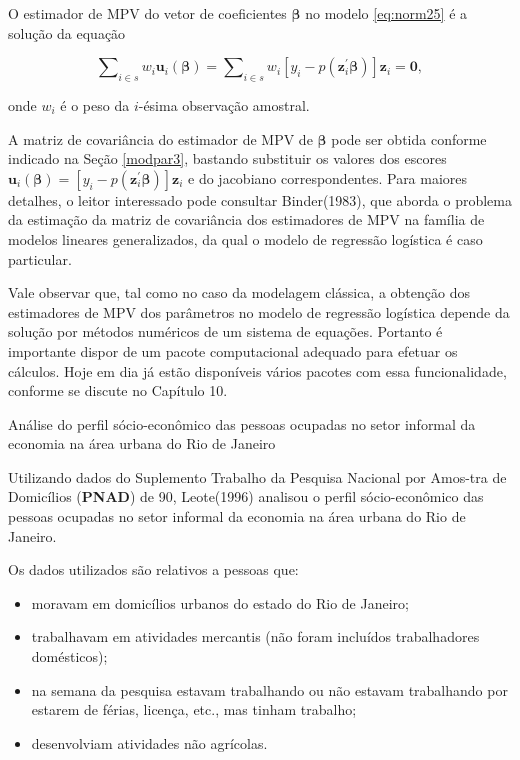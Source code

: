 \documentclass[]{book}
\let\BeginKnitrBlock\begin \let\EndKnitrBlock\end
\begin{document}
O estimador de MPV do vetor de coeficientes \(\mathbf{\beta }\) no
modelo \eqref{eq:norm25} é a solução da equação

\begin{equation}
\sum\nolimits_{i\in s}w_{i}\mathbf{u}_{i}\left( \mathbf{\beta }\right)
=\sum\nolimits_{i\in s}w_{i}\left[ y_{i}-p\left( \mathbf{z}_{i}^{\prime }
\mathbf{\beta }\right) \right] \mathbf{z}_{i}=\mathbf{0},
\label{eq:norm27}
\end{equation}

onde \(w_{i}\) é o peso da \(i\)-ésima observação amostral.

A matriz de covariância do estimador de MPV de \(\mathbf{\beta }\) pode
ser obtida conforme indicado na Seção \ref{modpar3}, bastando substituir
os valores dos escores
\(\mathbf{u}_{i}\left( \mathbf{\beta } \right) =\left[ y_{i}-p\left( \mathbf{z}_{i}^{\prime }\mathbf{\beta }\right) \right] \mathbf{z}_{i}\)
e do jacobiano correspondentes. Para maiores detalhes, o leitor
interessado pode consultar Binder(1983), que aborda o problema da
estimação da matriz de covariância dos estimadores de MPV na família de
modelos lineares generalizados, da qual o modelo de regressão logística
é caso particular.

Vale observar que, tal como no caso da modelagem clássica, a obtenção
dos estimadores de MPV dos parâmetros no modelo de regressão logística
depende da solução por métodos numéricos de um sistema de equações.
Portanto é importante dispor de um pacote computacional adequado para
efetuar os cálculos. Hoje em dia já estão disponíveis vários pacotes com
essa funcionalidade, conforme se discute no Capítulo 10.

\BeginKnitrBlock{example}
\protect\hypertarget{ex:pnad}{}{\label{ex:pnad}}Análise do perfil
sócio-econômico das pessoas ocupadas no setor informal da economia na
área urbana do Rio de Janeiro
\EndKnitrBlock{example}

Utilizando dados do Suplemento Trabalho da Pesquisa Nacional por
Amos-tra de Domicílios (\textbf{PNAD}) de 90, Leote(1996) analisou o
perfil sócio-econômico das pessoas ocupadas no setor informal da
economia na área urbana do Rio de Janeiro.

Os dados utilizados são relativos a pessoas que:

\begin{itemize}
\item
  moravam em domicílios urbanos do estado do Rio de Janeiro;
\item
  trabalhavam em atividades mercantis (não foram incluídos trabalhadores
  domésticos);
\item
  na semana da pesquisa estavam trabalhando ou não estavam trabalhando
  por estarem de férias, licença, etc., mas tinham trabalho;
\item
  desenvolviam atividades não agrícolas.
\end{itemize}
\end{document}
